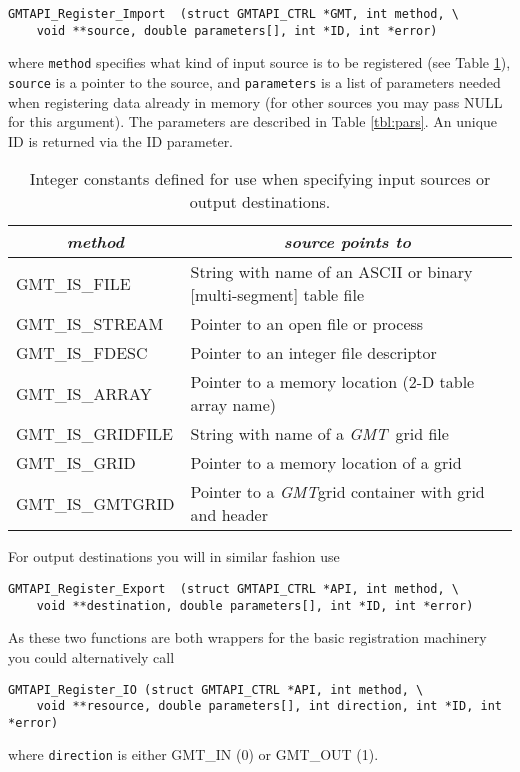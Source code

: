 \documentclass{report}
\newcommand{\GMT}{\textit{GMT}}%
\newcommand{\GMT}{\htmladdnormallink{\texttt{[image: eps/GMT\_glyph10.eps]}}{http://gmt.soest.hawaii.edu}}%
\newcommand{\GMT}{\htmladdnormallink{\textbf{GMT}}{http://gmt.soest.hawaii.edu}}%
\begin{document}
\begin{verbatim}
GMTAPI_Register_Import  (struct GMTAPI_CTRL *GMT, int method, \
    void **source, double parameters[], int *ID, int *error)
\end{verbatim}
where \texttt{method} specifies what kind of input source is to be registered (see Table \ref{tbl:methods}),
\texttt{source} is a pointer to the source, and \texttt{parameters} is a list of parameters needed
when registering data already in memory (for other sources you may pass NULL for this argument).  The
parameters are described in Table \ref{tbl:pars}. An unique ID is returned via the ID parameter.
\begin{table}[h]
\small
\centering
\begin{tabular}{|l|l|} \hline
\multicolumn{1}{|c|}{\emph{method}} & \multicolumn{1}{c|}{\emph{source points to}} \\ \hline
GMT\_IS\_FILE		&       String with name of an ASCII or binary [multi-segment] table file \\ \hline
GMT\_IS\_STREAM		&       Pointer to an open file or process \\ \hline
GMT\_IS\_FDESC		&       Pointer to an integer file descriptor \\ \hline
GMT\_IS\_ARRAY		&       Pointer to a memory location (2-D table array name) \\ \hline
GMT\_IS\_GRIDFILE	&       String with name of a \GMT\ grid file \\ \hline
GMT\_IS\_GRID		&       Pointer to a memory location of a grid  \\ \hline
GMT\_IS\_GMTGRID	&       Pointer to a \GMT grid container with grid and header  \\ \hline
\end{tabular}
\caption{Integer constants defined for use when specifying input sources or output destinations.}
\label{tbl:methods}
\end{table}

For output destinations you will in similar fashion use

\begin{verbatim}
GMTAPI_Register_Export  (struct GMTAPI_CTRL *API, int method, \
    void **destination, double parameters[], int *ID, int *error)
\end{verbatim}
As these two functions are both wrappers for the basic
registration machinery you could alternatively call
\begin{verbatim}
GMTAPI_Register_IO (struct GMTAPI_CTRL *API, int method, \
    void **resource, double parameters[], int direction, int *ID, int *error)
\end{verbatim}
where \texttt{direction} is either GMT\_IN (0) or GMT\_OUT (1).
\end{document}
